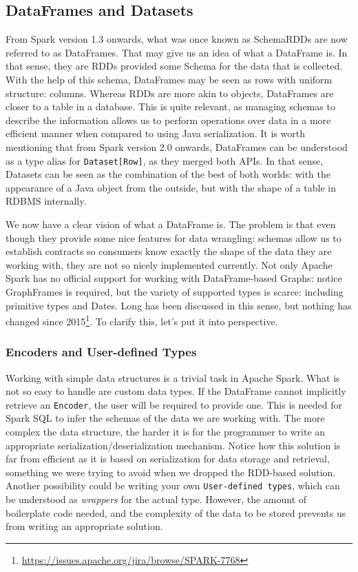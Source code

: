\subsection{DataFrames and Datasets}

From Spark version 1.3 onwards, what was once known as SchemaRDDs are now referred to as DataFrames. That may give us an idea of what a DataFrame is. In that sense, they are RDDs provided some Schema for the data that is collected. With the help of this schema, DataFrames may be seen as rows with uniform structure: columns. Whereas RDDs are more akin to objects, DataFrames are closer to a table in a database. This is quite relevant, as managing schemas to describe the information allows us to perform operations over data in a more efficient manner when compared to using Java serialization. It is worth mentioning that from Spark version 2.0 onwards, DataFrames can be understood as a type alias for \texttt{Dataset[Row]}, as they merged both APIs. In that sense, Datasets can be seen as the combination of the best of both worlds: with the appearance of a Java object from the outside, but with the shape of a table in RDBMS internally.

We now have a clear vision of what a DataFrame is. The problem is that even though they provide some nice features for data wrangling: schemas allow us to establish contracts so consumers know exactly the shape of the data they are working with, they are not so nicely implemented currently. Not only Apache Spark has no official support for working with DataFrame-based Graphs: notice GraphFrames is required, but the variety of supported types is scarce: including primitive types and Dates. Long has been discussed in this sense, but nothing has changed since 2015\footnote{\url{https://issues.apache.org/jira/browse/SPARK-7768}}. To clarify this, let's put it into perspective.

\label{sec:encoders}
\subsubsection{Encoders and User-defined Types}

Working with simple data structures is a trivial task in Apache Spark. What is not so easy to handle are custom data types. If the DataFrame cannot implicitly retrieve an \texttt{Encoder}, the user will be required to provide one. This is needed for Spark SQL to infer the schemas of the data we are working with. The more complex the data structure, the harder it is for the programmer to write an appropriate serialization/deserialization mechanism. Notice how this solution is far from efficient as it is based on serialization for data storage and retrieval, something we were trying to avoid when we dropped the RDD-based solution. Another possibility could be writing your own \texttt{User-defined types}, which can be understood as \textit{wrappers} for the actual type. However, the amount of boilerplate code needed, and the complexity of the data to be stored prevents us from writing an appropriate solution.

